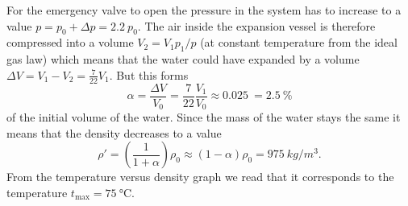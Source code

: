 \solueng
For the emergency valve to open the pressure in the system has to increase to a value $p=p_0+\Delta p = \SI{2.2}{}p_0$. The air inside the expansion vessel is therefore compressed into a volume $V_2=V_1 p_1/p$ (at constant temperature from the ideal gas law) which means that the water could have expanded by a volume $\Delta V = V_1-V_2 = \frac{7}{22}V_1$. But this forms
\[\alpha = \frac{\Delta V}{V_0}= \frac{7}{22}\frac{V_1}{V_0}\approx \SI{0.025}{} =  \SI{2.5}{}\%\] 
of the initial volume of the water.  Since the mass of the water stays the same it means that the density decreases to a value
\[\rho'=\left(\frac{1}{1+\alpha}\right)\rho_0\approx(1-\alpha)\rho_0= \SI{975}{kg/m^3}.\] 
From the temperature versus density graph we read that it corresponds to the temperature $t_\text{max}=\SI{75}{\degreeCelsius}$.
\probend